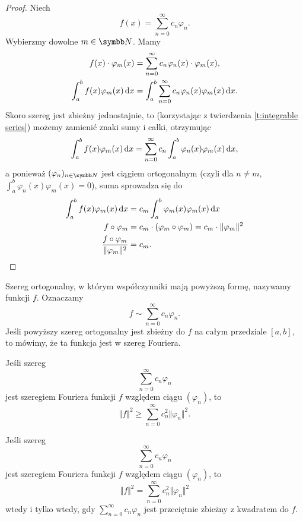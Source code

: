 \begin{proof}
    Niech
    \[ f(x) = \sum_{n=0}^\infty c_n\varphi_n. \]
    Wybierzmy dowolne $m \in \NN$. Mamy
    \begin{align*}
        f(x) \cdot \varphi_m (x)
        &= \sum_{n=0}^\infty c_n \varphi_n(x) \cdot \varphi_m(x), \\
        \int_a^b f(x) \varphi_m(x) \operatorname{d}\!{x}
        &= \int_a^b \sum_{n=0}^\infty c_n \varphi_n(x) \varphi_m(x) \operatorname{d}\!{x}.
    \end{align*}
    Skoro szereg jest zbieżny jednostajnie, to (korzystając z twierdzenia \ref{t:integrable series}) możemy zamienić znaki sumy i całki, otrzymując
    \[ \int_a^b f(x) \varphi_m(x) \operatorname{d}\!{x} = \sum_{n=0}^\infty c_n \int_a^b \varphi_n(x) \varphi_m(x) \operatorname{d}\!{x}, \]
    a ponieważ $(\varphi_n)_{n \in \NN}$ jest ciągiem ortogonalnym (czyli dla $n \neq m$, $\int_a^b \varphi_n(x) \varphi_m(x) = 0$), suma sprowadza się do
    \begin{align*}
        \int_a^b f(x) \varphi_m(x) \operatorname{d}\!{x}
        &= c_m \int_a^b \varphi_m(x) \varphi_m(x) \operatorname{d}\!{x} \\
        f \circ \varphi_m
        &= c_m \cdot (\varphi_m \circ \varphi_m)
        = c_m \cdot \Vert \varphi_m \Vert^2 \\
        \frac{f \circ \varphi_m}{\Vert \varphi_m \Vert^2}
        &= c_m.
    \end{align*}
\end{proof}

Szereg ortogonalny, w którym współczynniki mają powyższą formę, nazywamy  funkcji $f$. Oznaczamy
\[ f \sim \sum_{n=0}^\infty c_n\varphi_n. \]
Jeśli powyższy szereg ortogonalny jest zbieżny do $f$ na całym przedziale $[a, b]$, to mówimy, że ta funkcja jest  w szereg Fouriera.

\begin{theorem}
    Jeśli szereg
    \[ \sum_{n=0}^\infty c_n\varphi_n \]
    jest szeregiem Fouriera funkcji $f$ względem ciągu $(\varphi_n)$, to
    \[ \Vert f \Vert^2 \geq \sum_{n=0}^\infty c_n^2 \Vert \varphi_n \Vert^2. \]
\end{theorem}

\begin{theorem}
    \label{t:Parseval}
    Jeśli szereg
    \[ \sum_{n=0}^\infty c_n\varphi_n \]
    jest szeregiem Fouriera funkcji $f$ względem ciągu $(\varphi_n)$, to
    \[ \Vert f \Vert^2 = \sum_{n=0}^\infty c_n^2 \Vert \varphi_n \Vert^2 \]
    wtedy i tylko wtedy, gdy $\sum_{n=0}^\infty c_n\varphi_n$ jest przeciętnie zbieżny z kwadratem do $f$.
\end{theorem}

